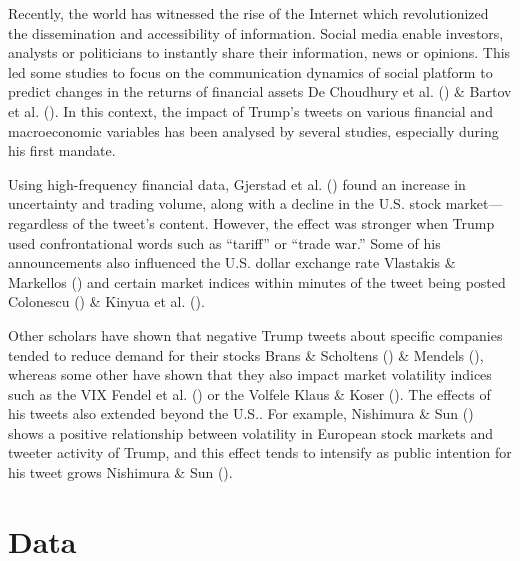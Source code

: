 \documentclass[
]{article}
\begin{document}
Recently, the world has witnessed the rise of the Internet
which revolutionized the dissemination and accessibility of information.
Social media enable investors, analysts or politicians to instantly
share their information, news or opinions. This led some studies to
focus on the communication dynamics of social platform to predict
changes in the returns of financial assets De Choudhury et al. () \&
Bartov et al. (). In this context, the
impact of Trump's tweets on various financial and macroeconomic
variables has been analysed by several studies, especially during his
first mandate.

Using high-frequency financial data,
Gjerstad et al. () found an increase in uncertainty and
trading volume, along with a decline in the U.S. stock market---regardless
of the tweet's content. However, the effect was stronger when Trump used
confrontational words such as ``tariff'' or ``trade war.'' Some of his
announcements also influenced the U.S. dollar exchange rate Vlastakis \& Markellos ()
and certain market indices within minutes of the tweet being posted
Colonescu () \& Kinyua et al. ().

Other scholars have shown that negative Trump tweets about specific
companies tended to reduce demand for their stocks Brans \& Scholtens () \&
Mendels (), whereas some
other have shown that they also impact market volatility indices such as
the VIX Fendel et al. () or the Volfele Klaus \& Koser ().
The effects of his tweets also extended beyond the U.S.. For example,
Nishimura \& Sun () shows a
positive relationship between volatility in European stock markets and
tweeter activity of Trump, and this effect tends to intensify as public
intention for his tweet grows Nishimura \& Sun ().

\section{Data}\label{data}
\end{document}
